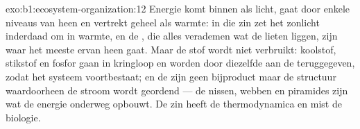 \begin{solution}{exo:b1:ecosystem-organization:12}
Energie komt binnen als licht, gaat door enkele niveaus van  heen
en vertrekt geheel als warmte: in die zin zet het  zonlicht
inderdaad om in warmte, en de , die alles verademen wat de
 lieten liggen, zijn waar het meeste ervan heen gaat. Maar de
stof wordt niet verbruikt: koolstof, stikstof en fosfor gaan in kringloop en
worden door diezelfde  aan de  teruggegeven, zodat het
systeem voortbestaat; en de  zijn geen bijproduct maar de
structuur waardoorheen de stroom wordt geordend --- de nissen, webben en
piramides zijn wat de energie onderweg opbouwt. De zin heeft de
thermodynamica en mist de biologie.
\end{solution}

